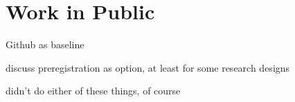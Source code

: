 
\section{Work in Public}

Github as baseline

discuss preregistration as option, at least for some research designs

\citet{Newman2015} didn't do either of these things, of course
